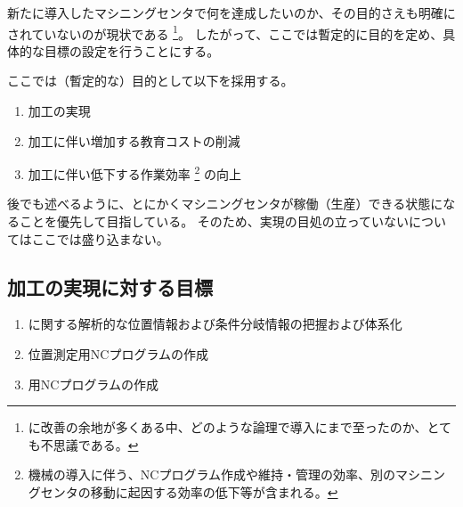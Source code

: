 

新たに導入したマシニングセンタで何を達成したいのか、その目的さえも明確にされていないのが現状である
\footnote{\MMC に改善の余地が多くある中、どのような論理で導入にまで至ったのか、とても不思議である。}。
したがって、ここでは暫定的に目的を定め、具体的な目標の設定を行うことにする。



ここでは（暫定的な）目的として以下を採用する。
\begin{enumerate}[label=\sarrow]
\item \Dimple 加工の実現
\item \Dimple 加工に伴い増加する教育コストの削減
\item \Dimple 加工に伴い低下する作業効率%
\footnote{機械の導入に伴う、NCプログラム作成や維持・管理の効率、別のマシニングセンタの移動に起因する効率の低下等が含まれる。}
の向上
\end{enumerate}
\begin{hosoku}
後でも述べるように、とにかくマシニングセンタが稼働（生産）できる状態になることを優先して目指している。
そのため、実現の目処の立っていない\ReliefGrooveMilling についてはここでは盛り込まない。
\end{hosoku}


\clearpage


\subsection{\Dimple 加工の実現に対する目標}
\begin{enumerate}[label=\sarrow]
\item \Dimple に関する解析的な位置情報および条件分岐情報の把握および体系化
\item \Dimple 位置測定用NCプログラムの作成
\item \DimpleMilling 用NCプログラムの作成
\end{enumerate}


